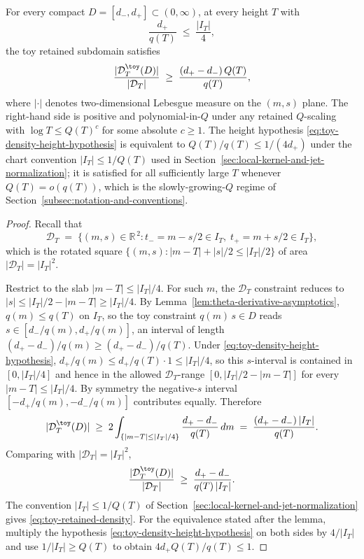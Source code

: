 \begin{lemma}
\label{lem:toy-retained-density}
For every compact \(D=[d_-,d_+]\subset(0,\infty)\), at every height
\(T\) with
\begin{equation}
\label{eq:toy-density-height-hypothesis}
        \frac{d_+}{q(T)}\;\le\;\frac{|I_T|}{4},
\end{equation}
the toy retained subdomain satisfies
\begin{equation}
\label{eq:toy-retained-density}
    \frac{|\mathcal D_T^\toy(D)|}{|\mathcal D_T|}
    \;\ge\;
    \frac{(d_+-d_-)\,Q(T)}{q(T)},
\end{equation}
where \(|\cdot|\) denotes two-dimensional Lebesgue measure on the
\((m,s)\) plane.  The right-hand side is positive and
polynomial-in-\(Q\) under any retained \(Q\)-scaling with
\(\log T\le Q(T)^{c}\) for some absolute \(c\ge 1\).  The height
hypothesis \eqref{eq:toy-density-height-hypothesis} is equivalent to
\(Q(T)/q(T)\le 1/(4 d_+)\) under the chart convention
\(|I_T|\le 1/Q(T)\) used in
Section~\ref{sec:local-kernel-and-jet-normalization}; it is satisfied
for all sufficiently large \(T\) whenever \(Q(T)=o(q(T))\), which is
the slowly-growing-\(Q\) regime of
Section~\ref{subsec:notation-and-conventions}.
\end{lemma}

\begin{proof}
Recall that
\[
    \mathcal D_T
    \;=\;\bigl\{(m,s)\in\mathbb R^{\,2}: t_-=m-s/2\in I_T,\;
        t_+=m+s/2\in I_T\bigr\},
\]
which is the rotated square
\(\{(m,s):|m-T|+|s|/2\le |I_T|/2\}\) of area \(|\mathcal D_T|=|I_T|^{2}\).

Restrict to the slab \(|m-T|\le|I_T|/4\).  For such \(m\), the
\(\mathcal D_T\) constraint reduces to \(|s|\le|I_T|/2-|m-T|\ge|I_T|/4\).
By Lemma~\ref{lem:theta-derivative-asymptotics},
\(q(m)\le q(T)\) on \(I_T\), so the toy constraint
\(q(m)\,s\in D\) reads
\(s\in[d_-/q(m),d_+/q(m)]\), an interval of length
\((d_+-d_-)/q(m)\ge(d_+-d_-)/q(T)\).  Under
\eqref{eq:toy-density-height-hypothesis},
\(d_+/q(m)\le d_+/q(T)\cdot 1\le|I_T|/4\), so this \(s\)-interval is
contained in \([0,|I_T|/4]\) and hence in the allowed
\(\mathcal D_T\)-range \([0,|I_T|/2-|m-T|]\) for every
\(|m-T|\le|I_T|/4\).  By symmetry the negative-\(s\) interval
\([-d_+/q(m),-d_-/q(m)]\) contributes equally.  Therefore
\[
    |\mathcal D_T^\toy(D)|
    \;\ge\;2\int_{\{|m-T|\le|I_T|/4\}}\frac{d_+-d_-}{q(T)}\,dm
    \;=\;\frac{(d_+-d_-)\,|I_T|}{q(T)}.
\]
Comparing with \(|\mathcal D_T|=|I_T|^{2}\),
\[
    \frac{|\mathcal D_T^\toy(D)|}{|\mathcal D_T|}
    \;\ge\;\frac{d_+-d_-}{q(T)\,|I_T|}.
\]
The convention \(|I_T|\le 1/Q(T)\) of
Section~\ref{sec:local-kernel-and-jet-normalization}
gives \eqref{eq:toy-retained-density}.  For the equivalence stated
after the lemma, multiply the hypothesis
\eqref{eq:toy-density-height-hypothesis} on both sides by \(4/|I_T|\)
and use \(1/|I_T|\ge Q(T)\) to obtain \(4 d_+ Q(T)/q(T)\le 1\).
\end{proof}

